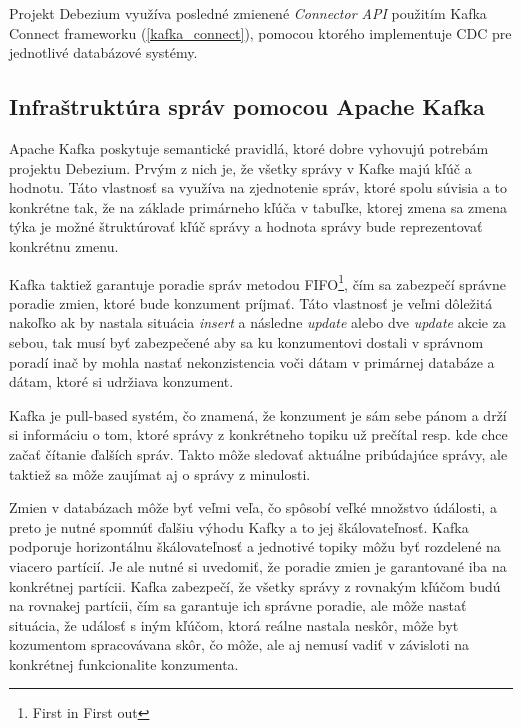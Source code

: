 Projekt Debezium využíva posledné zmienené \textit{Connector API} použitím Kafka Connect frameworku (\ref{kafka_connect}), pomocou ktorého implementuje CDC pre jednotlivé databázové systémy.

\subsection{Infraštruktúra správ pomocou Apache Kafka}
Apache Kafka poskytuje semantické pravidlá, ktoré dobre vyhovujú potrebám projektu Debezium. Prvým z nich je, že všetky správy v Kafke majú kľúč a hodnotu. Táto vlastnosť sa využíva na zjednotenie správ, ktoré spolu súvisia a to konkrétne tak, že na základe primárneho kľúča v tabuľke, ktorej zmena sa zmena týka je možné štruktúrovať kľúč správy a hodnota správy bude reprezentovať konkrétnu zmenu.

Kafka taktiež garantuje poradie správ metodou FIFO\footnote{First in First out}, čím sa zabezpečí správne poradie zmien, ktoré bude konzument príjmať. Táto vlastnosť je veľmi dôležitá nakoľko ak by nastala situácia \textit{insert} a následne \textit{update} alebo dve \textit{update} akcie za sebou, tak musí byť zabezpečené aby sa ku konzumentovi dostali v správnom poradí inač by mohla nastať nekonzistencia voči dátam v primárnej databáze a dátam, ktoré si udržiava konzument.

Kafka je pull-based systém, čo znamená, že konzument je sám sebe pánom a drží si informáciu o tom, ktoré správy z konkrétneho topiku už prečítal resp. kde chce začať čítanie ďalších správ. Takto môže sledovať aktuálne pribúdajúce správy, ale taktiež sa môže zaujímat aj o správy z minulosti.

Zmien v databázach môže byť veľmi veľa, čo spôsobí veľké množstvo údálosti, a preto je nutné spomnúť ďalšiu výhodu Kafky a to jej škálovateľnosť. Kafka podporuje horizontálnu škálovateľnosť a jednotivé topiky môžu byť rozdelené na viacero partícií. Je ale nutné si uvedomiť, že poradie zmien je garantované iba na konkrétnej partícii. Kafka zabezpečí, že všetky správy z rovnakým kľúčom budú na rovnakej partícii, čím sa garantuje ich správne poradie, ale môže nastať situácia, že událosť s iným kľúčom, ktorá reálne nastala neskôr, môže byt kozumentom spracovávana skôr, čo môže, ale aj nemusí vadiť v závisloti na konkrétnej funkcionalite konzumenta.

